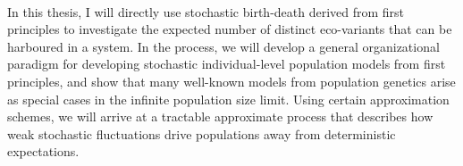 \\
In this thesis, I will directly use stochastic birth-death derived from first principles to investigate the expected number of distinct eco-variants that can be harboured in a system. In the process, we will develop a general organizational paradigm for developing stochastic individual-level population models from first principles, and show that many well-known models from population genetics arise as special cases in the infinite population size limit. Using certain approximation schemes, we will arrive at a tractable approximate process that describes how weak 
stochastic fluctuations drive populations away from deterministic expectations.

